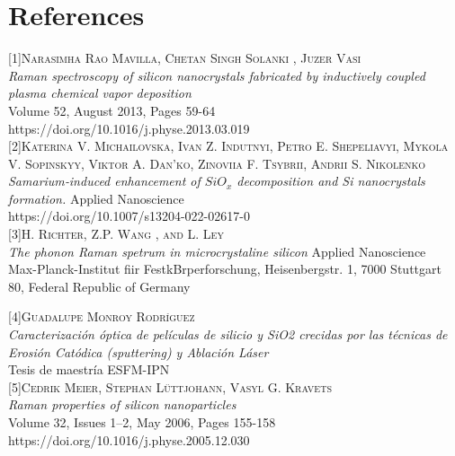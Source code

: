 \documentclass[a4paper,10pt,twocolumn]{article}
\begin{document}
\section{References}
\small{
[1]\textsc{Narasimha Rao Mavilla,  Chetan Singh Solanki ,  Juzer Vasi} \\
\textit{Raman spectroscopy of silicon nanocrystals fabricated by inductively coupled plasma chemical vapor deposition}\\
    Volume 52, August 2013, Pages 59-64 \\
https://doi.org/10.1016/j.physe.2013.03.019 \\

    [2]\textsc{Katerina V. Michailovska, Ivan Z. Indutnyi, Petro E. Shepeliavyi, Mykola V. Sopinskyy, Viktor A. Dan’ko, Zinoviia F. Tsybrii, Andrii S. Nikolenko} \\
\textit{Samarium‑induced enhancement of $ SiO_{x} $ decomposition and Si nanocrystals formation. }
Applied Nanoscience \\
    https://doi.org/10.1007/s13204-022-02617-0 \\

    [3]\textsc{H. Richter, Z.P. Wang , and L. Ley}\\
\textit{The phonon Raman spetrum in microcrystaline silicon }
Applied Nanoscience \\
    Max-Planck-Institut fiir FestkBrperforschung, Heisenbergstr. 1, 7000 Stuttgart 80, Federal Republic of Germany

    [4]\textsc{Guadalupe Monroy Rodríguez} \\
\textit{Caracterización óptica de películas de silicio y SiO2 crecidas por las técnicas de Erosión Catódica (sputtering) y Ablación Láser } \\
Tesis de maestría ESFM-IPN \\

    [5]\textsc{Cedrik Meier,  Stephan Lüttjohann,  Vasyl G. Kravets}\\
\textit{Raman properties of silicon nanoparticles}\\
    Volume 32, Issues 1–2, May 2006, Pages 155-158 \\
    https://doi.org/10.1016/j.physe.2005.12.030 \\
}
\end{document}
